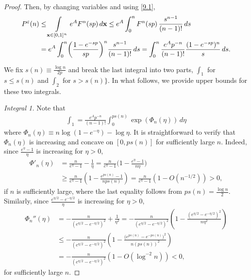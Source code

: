 \documentclass[11pt]{amsart}
\def\eps{\varepsilon}
\theoremstyle{remark}
\numberwithin{equation}{section}
\begin{document}
\begin{proof}
Then, by changing variables and using \eqref{9.1},
\begin{align*}
P^{\eps}(n) &\leq \int\limits_{\bold x\in [0,1]^n} e^A F^n(sp)\,d\bold x \leq e^{A}\int_0^{n}F^n(sp)\,\frac{s^{n-1}}{(n-1)!}\,ds\\
&= e^{A}\int_0^{n}\biggl(\frac{1-e^{-sp}}{sp}\biggr)^n\frac{s^{n-1}}{(n-1)!}\,ds=\int_0^{n}\frac{e^Ap^{-n}}{(n-1)!}\frac{(1-e^{-sp})^n}{s}\,ds.
\end{align*}


We fix $s(n) \equiv \tfrac{\log n}{2p}$ and break the last integral into two parts, $\int_1$ for $s \leq s(n)$ and $\int_2$ for $s > s(n)\}$. In what follows, we provide upper bounds for these two integrals.\bigskip

\noindent \textit{Integral 1.}
Note that
\begin{align*}
\int_1=\frac{e^Ap^{-n}}{(n-1)!}\int_0^{ps(n)}\exp(\Phi_n(\eta))\,d \eta
\end{align*}
where $\Phi_n(\eta) \equiv n\log(1-e^{-\eta})-\log\eta$. 
It is straightforward to verify that $\Phi_n(\eta)$ is increasing and concave on $[0,ps(n)]$ for sufficiently large $n$. Indeed, since $\tfrac{e^{\eta}-1}{\eta}$ is increasing for $\eta>0$,
\begin{align*}
\Phi'_n(\eta)&=\frac{n}{e^{\eta}-1}-\frac{1}{\eta}=\frac{n}{e^{\eta}-1}\bigl(1-\frac{e^{\eta}-1}{n\eta}\bigr)\\
&\geq \frac{n}{e^{\eta}-1}\left(1-\frac{e^{ps(n)}-1}{nps(n)}\right)=\frac{n}{e^{\eta}-1}(1-O(n^{-1/2}))>0,
\end{align*}
if $n$ is sufficiently large, where the last equality follows from $ps(n)=\tfrac{\log n}{2}$. Similarly, since $\tfrac{e^{\eta/2}-e^{-\eta/2}}{\eta}$ is increasing for $\eta>0$, 
\begin{align*}
\Phi_n''(\eta)&=-\frac{n}{(e^{\eta/2}-e^{-\eta/2})^2}+\frac{1}{\eta^2}=-\frac{n}{(e^{\eta/2}-e^{-\eta/2})^2}\left(1-\frac{(e^{\eta/2}-e^{-\eta/2})^2}{n\eta^2}\right)\\
&\leq-\frac{n}{(e^{\eta/2}-e^{-\eta/2})^2}\left(1-\frac{\bigl(e^{ps(n)}-e^{-ps(n)}\bigr)^2}{n(ps(n))^2}\right)\\
&=-\frac{n}{(e^{\eta/2}-e^{-\eta/2})^2}(1-O(\log^{-2}n)) < 0,
\end{align*}
for sufficiently large $n$.


\end{proof}
\end{document}
